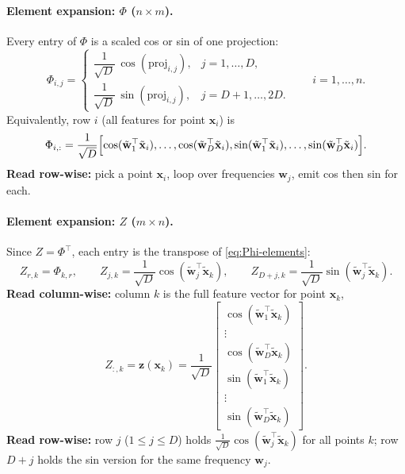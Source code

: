 \documentclass[11pt]{article}
\newcommand{\Ph}{\Phi}
\newcommand{\Zmat}{Z}
\begin{document}
\paragraph{Element expansion: $\Ph$ ($n \times m$).}
Every entry of $\Ph$ is a scaled cos or sin of one projection:
\begin{equation}
  \label{eq:Phi-elements}
  \Ph_{i,j}
  =
  \begin{cases}
    \dfrac{1}{\sqrt{D}}\,\cos(\mathrm{proj}_{i,j}),
    & j = 1,\ldots,D, \\[6pt]
    \dfrac{1}{\sqrt{D}}\,\sin(\mathrm{proj}_{i,j}),
    & j = D+1,\ldots,2D.
  \end{cases}
  \qquad i=1,\ldots,n.
\end{equation}
Equivalently, row $i$ (all features for point $\mathbf x_i$) is
\begin{equation}
  \label{eq:Phi-row}
  \Ph_{i,:}
  = \frac{1}{\sqrt{D}}
  \Bigl[
    \cos(\tilde{\mathbf w}_1^{\top}\tilde{\mathbf x}_i),
    \ldots,
    \cos(\tilde{\mathbf w}_D^{\top}\tilde{\mathbf x}_i),
    \sin(\tilde{\mathbf w}_1^{\top}\tilde{\mathbf x}_i),
    \ldots,
    \sin(\tilde{\mathbf w}_D^{\top}\tilde{\mathbf x}_i)
  \Bigr].
\end{equation}
\textbf{Read row-wise:} pick a point $\mathbf x_i$, loop over frequencies $\mathbf w_j$, emit cos then sin for each.

\paragraph{Element expansion: $\Zmat$ ($m \times n$).}
Since $\Zmat=\Ph^{\top}$, each entry is the transpose of \eqref{eq:Phi-elements}:
\begin{equation}
  \label{eq:Z-elements}
  \Zmat_{r,k} = \Ph_{k,r},
  \qquad
  \Zmat_{j,k} = \frac{1}{\sqrt{D}}\cos(\tilde{\mathbf w}_j^{\top}\tilde{\mathbf x}_k),
  \qquad
  \Zmat_{D+j,k} = \frac{1}{\sqrt{D}}\sin(\tilde{\mathbf w}_j^{\top}\tilde{\mathbf x}_k).
\end{equation}
\textbf{Read column-wise:} column $k$ is the full feature vector for point $\mathbf x_k$,
\[
  \Zmat_{:,k}
  = \mathbf z(\mathbf x_k)
  = \frac{1}{\sqrt{D}}
  \begin{bmatrix}
    \cos(\tilde{\mathbf w}_1^{\top}\tilde{\mathbf x}_k) \\
    \vdots \\
    \cos(\tilde{\mathbf w}_D^{\top}\tilde{\mathbf x}_k) \\
    \sin(\tilde{\mathbf w}_1^{\top}\tilde{\mathbf x}_k) \\
    \vdots \\
    \sin(\tilde{\mathbf w}_D^{\top}\tilde{\mathbf x}_k)
  \end{bmatrix}.
\]
\textbf{Read row-wise:} row $j$ ($1\le j\le D$) holds $\frac{1}{\sqrt{D}}\cos(\tilde{\mathbf w}_j^{\top}\tilde{\mathbf x}_k)$ for all points $k$;
row $D+j$ holds the sin version for the same frequency $\mathbf w_j$.
\end{document}

